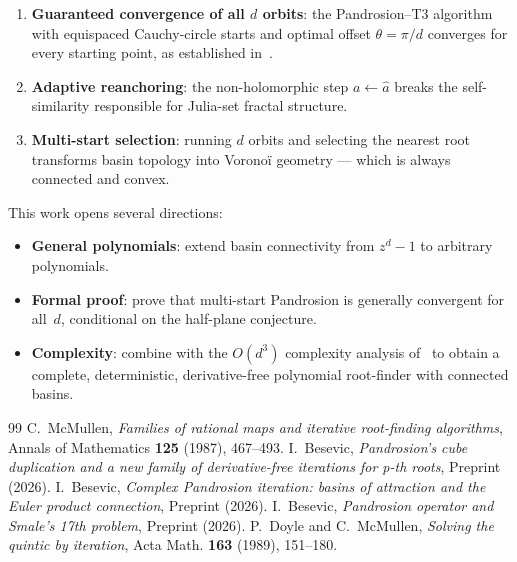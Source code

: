 \documentclass[11pt,a4paper]{article}
\theoremstyle{definition}
\theoremstyle{remark}
\begin{document}
\begin{enumerate}
\item \textbf{Guaranteed convergence of all $d$ orbits}: the Pandrosion--T3 algorithm with equispaced Cauchy-circle starts and optimal offset $\theta = \pi/d$ converges for every starting point, as established in~\cite{Besevic2026g}.
\item \textbf{Adaptive reanchoring}: the non-holomorphic step $a \leftarrow \hat{a}$ breaks the self-similarity responsible for Julia-set fractal structure.
\item \textbf{Multi-start selection}: running $d$ orbits and selecting the nearest root transforms basin topology into Vorono\"i geometry --- which is always connected and convex.
\end{enumerate}

This work opens several directions:
\begin{itemize}
\item \textbf{General polynomials}: extend basin connectivity from $z^d - 1$ to arbitrary polynomials.
\item \textbf{Formal proof}: prove that multi-start Pandrosion is generally convergent for all~$d$, conditional on the half-plane conjecture.
\item \textbf{Complexity}: combine with the $O(d^3)$ complexity analysis of~\cite{Besevic2026g} to obtain a complete, deterministic, derivative-free polynomial root-finder with connected basins.
\end{itemize}

\begin{thebibliography}{99}
 C.~McMullen, \emph{Families of rational maps and iterative root-finding algorithms}, Annals of Mathematics \textbf{125} (1987), 467--493.
 I.~Besevic, \emph{Pandrosion's cube duplication and a new family of derivative-free iterations for p-th roots}, Preprint (2026).
 I.~Besevic, \emph{Complex Pandrosion iteration: basins of attraction and the Euler product connection}, Preprint (2026).
 I.~Besevic, \emph{Pandrosion operator and Smale's 17th problem}, Preprint (2026).
 P.~Doyle and C.~McMullen, \emph{Solving the quintic by iteration}, Acta Math. \textbf{163} (1989), 151--180.
\end{thebibliography}
\end{document}
